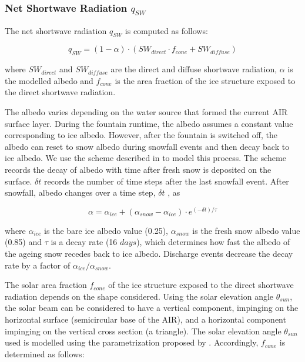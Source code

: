 \subsubsection{Net Shortwave Radiation \texorpdfstring{$q_{SW}$}{Lg}}

The net shortwave radiation $q_{SW}$ is computed as follows:

\begin{equation} q_{SW} = (1- \alpha)\cdot (SW_{direct} \cdot f_{cone} + SW_{diffuse}) \label{eqn:SW} \end{equation}

where $SW_{direct}$ and $SW_{diffuse}$ are the direct and diffuse shortwave radiation, $\alpha$ is the
modelled albedo and $f_{cone}$ is the area fraction of the ice structure exposed to the direct shortwave
radiation.

The albedo varies depending on the water source that formed the current AIR surface layer. During the fountain
runtime, the albedo assumes a constant value corresponding to ice albedo. However, after the fountain is
switched off, the albedo can reset to snow albedo during snowfall events and then decay back to ice albedo. We
use the scheme described in \cite{oerlemansYearRecordGlobal1998} to model this process. The scheme records the
decay of albedo with time after fresh snow is deposited on the surface. $\delta t$ records the number of time
steps after the last snowfall event. After snowfall, albedo changes over a time step, $\delta t$ , as

\begin{equation} \alpha=\alpha_{ice}+(\alpha_{snow}-\alpha_{ice}) \cdot e^{(-\delta t)/\tau} \label{eqn:alb}
\end{equation}

where $\alpha_{ice}$ is the bare ice albedo value (0.25), $\alpha_{snow}$ is the fresh snow albedo value (0.85)
and $\tau$ is a decay rate (16 $days$), which determines how fast the albedo of the ageing snow recedes back to
ice albedo. Discharge events decrease the decay rate by a factor of $\alpha_{ice}/\alpha_{snow}$.

The solar area fraction $f_{cone}$ of the ice structure exposed to the direct shortwave radiation depends on the shape
considered. Using the solar elevation angle $\theta_{sun}$, the solar beam can be considered to have a vertical
component, impinging on the horizontal surface (semicircular base of the AIR), and a horizontal component
impinging on the vertical cross section (a triangle). The solar elevation angle $\theta_{sun}$ used is modelled
using the parametrization proposed by \cite{woolfComputationSolarElevation1968}. Accordingly, $f_{cone}$ is determined as follows:

